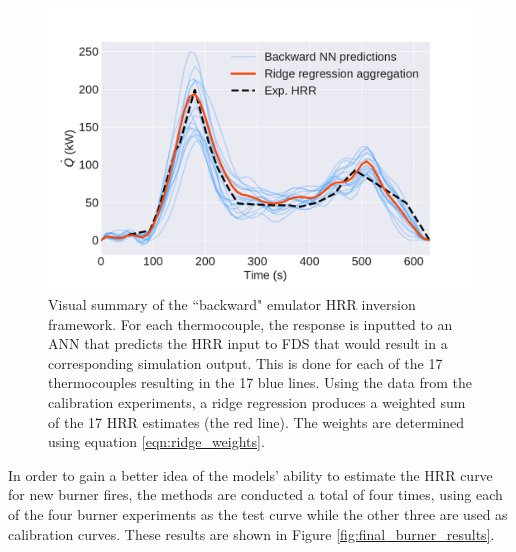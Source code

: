 \documentclass{article}
\begin{document}
\begin{figure}[htb] \centering
\includegraphics[width=.75\textwidth]{figures/backward_ridge_aggregation.pdf}
\caption{Visual summary of the ``backward" emulator HRR inversion framework. For each thermocouple, the response is inputted to an ANN that predicts the HRR input to FDS that would result in a corresponding simulation output. This is done for each of the 17 thermocouples resulting in the 17 blue lines. Using the data from the calibration experiments, a ridge regression produces a weighted sum of the 17 HRR estimates (the red line). The weights are determined using equation \protect\ref{eqn:ridge_weights}.}
\label{fig:backward_ridge_aggregation}
\end{figure}


In order to gain a better idea of the models' ability to estimate the HRR curve for new burner fires, the methods are conducted a total of four times, using each of the four burner experiments as the test curve while the other three are used as calibration curves. These results are shown in Figure \ref{fig:final_burner_results}.
\end{document}
